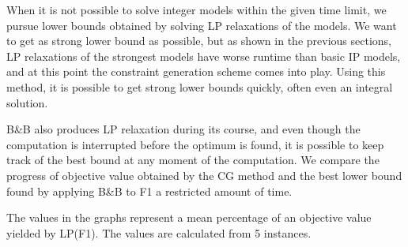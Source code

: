 When it is not possible to solve integer models within the given time limit, we pursue lower bounds obtained by solving LP relaxations of the models.
We want to get as strong lower bound as possible, but as shown in the previous sections, LP relaxations of the strongest models have worse runtime than basic IP models, and at this point the constraint generation scheme comes into play.
Using this method, it is possible to get strong lower bounds quickly, often even an integral solution.

B\&B also produces LP relaxation during its course, and even though the computation is interrupted before the optimum is found, it is possible to keep track of the best bound at any moment of the computation.
We compare the progress of objective value obtained by the CG method and the best lower bound found by applying B\&B to F1 a restricted amount of time.
 
The values in the graphs represent a mean percentage of an objective value yielded by LP(F1).
The values are calculated from 5 instances.
 
